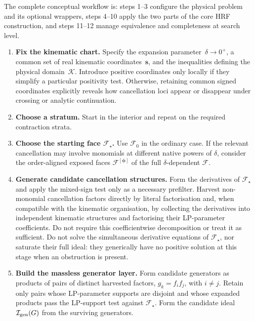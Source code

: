 \documentclass[a4paper,11pt]{article}
\newcommand{\s}{\boldsymbol{s}}
\newcommand{\K}{\mathcal K}
\begin{document}
The complete conceptual workflow is:
steps 1--3 configure the physical problem and its optional wrappers,
steps 4--10 apply the two parts of the core HRF construction, and
steps 11--12 manage equivalence and completeness at search level.
\begin{enumerate}[label=\textbf{\arabic*.},leftmargin=*]
\item \textbf{Fix the kinematic chart.}
      Specify the expansion parameter~\(\delta\to0^+\), a common set of real kinematic coordinates~\(\s\), and the inequalities defining the physical domain~\(\K\).
      Introduce positive coordinates only locally if they simplify a
      particular positivity test.  Otherwise, retaining common signed
      coordinates explicitly reveals how cancellation loci appear or
      disappear under crossing or analytic continuation.
\item \textbf{Choose a stratum.}
      Start in the interior and repeat on the required contraction strata.
\item \textbf{Choose the starting face  \(\mathcal F_\star\).}
      Use \(\mathcal F_0\) in the ordinary case.  If the relevant cancellation
      may involve monomials at different native powers of \(\delta\), consider
      the order-aligned exposed faces \(\mathcal F^{[\boldsymbol\phi]}\) of the
      full \(\delta\)-dependent \(\mathcal F\).
\item \textbf{Generate candidate cancellation structures.}
      Form the derivatives of \(\mathcal F_\star\) and apply the mixed-sign
      test only as a necessary prefilter.  Harvest non-monomial cancellation
      factors directly by literal factorisation and, when compatible with the
      kinematic organisation, by collecting the derivatives into independent
      kinematic structures and factorising their LP-parameter coefficients.
      Do not require this coefficientwise decomposition or treat it as
      sufficient.  Do not solve the simultaneous derivative
      equations of \(\mathcal F_\star\), nor saturate their full ideal: they
      generically have no positive solution at this stage when an obstruction
      is present.
\item \textbf{Build the massless generator layer.}
      Form candidate generators as products of pairs of distinct harvested
      factors, \(g_k=f_if_j\), with \(i\neq j\).  Retain only pairs whose
      LP-parameter supports are disjoint and whose expanded products pass the
      LP-support test against \(\mathcal F_\star\).  Form the candidate ideal
      \(\mathcal I_{\rm gen}(G)\) from the surviving generators.

\end{enumerate}
\end{document}
